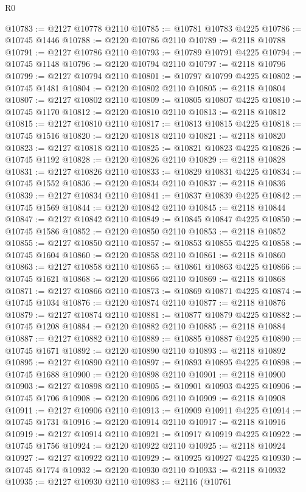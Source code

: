 \begin{lexlean}{R0}
\begin{coremodule}
@10783 := @2127 @10778 @2110
@10785 := @10781 @10783 @4225
@10786 := @10745 @1446
@10788 := @2120 @10786 @2110
@10789 := @2118 @10788
@10791 := @2127 @10786 @2110
@10793 := @10789 @10791 @4225
@10794 := @10745 @1148
@10796 := @2120 @10794 @2110
@10797 := @2118 @10796
@10799 := @2127 @10794 @2110
@10801 := @10797 @10799 @4225
@10802 := @10745 @1481
@10804 := @2120 @10802 @2110
@10805 := @2118 @10804
@10807 := @2127 @10802 @2110
@10809 := @10805 @10807 @4225
@10810 := @10745 @1170
@10812 := @2120 @10810 @2110
@10813 := @2118 @10812
@10815 := @2127 @10810 @2110
@10817 := @10813 @10815 @4225
@10818 := @10745 @1516
@10820 := @2120 @10818 @2110
@10821 := @2118 @10820
@10823 := @2127 @10818 @2110
@10825 := @10821 @10823 @4225
@10826 := @10745 @1192
@10828 := @2120 @10826 @2110
@10829 := @2118 @10828
@10831 := @2127 @10826 @2110
@10833 := @10829 @10831 @4225
@10834 := @10745 @1552
@10836 := @2120 @10834 @2110
@10837 := @2118 @10836
@10839 := @2127 @10834 @2110
@10841 := @10837 @10839 @4225
@10842 := @10745 @1569
@10844 := @2120 @10842 @2110
@10845 := @2118 @10844
@10847 := @2127 @10842 @2110
@10849 := @10845 @10847 @4225
@10850 := @10745 @1586
@10852 := @2120 @10850 @2110
@10853 := @2118 @10852
@10855 := @2127 @10850 @2110
@10857 := @10853 @10855 @4225
@10858 := @10745 @1604
@10860 := @2120 @10858 @2110
@10861 := @2118 @10860
@10863 := @2127 @10858 @2110
@10865 := @10861 @10863 @4225
@10866 := @10745 @1621
@10868 := @2120 @10866 @2110
@10869 := @2118 @10868
@10871 := @2127 @10866 @2110
@10873 := @10869 @10871 @4225
@10874 := @10745 @1034
@10876 := @2120 @10874 @2110
@10877 := @2118 @10876
@10879 := @2127 @10874 @2110
@10881 := @10877 @10879 @4225
@10882 := @10745 @1208
@10884 := @2120 @10882 @2110
@10885 := @2118 @10884
@10887 := @2127 @10882 @2110
@10889 := @10885 @10887 @4225
@10890 := @10745 @1671
@10892 := @2120 @10890 @2110
@10893 := @2118 @10892
@10895 := @2127 @10890 @2110
@10897 := @10893 @10895 @4225
@10898 := @10745 @1688
@10900 := @2120 @10898 @2110
@10901 := @2118 @10900
@10903 := @2127 @10898 @2110
@10905 := @10901 @10903 @4225
@10906 := @10745 @1706
@10908 := @2120 @10906 @2110
@10909 := @2118 @10908
@10911 := @2127 @10906 @2110
@10913 := @10909 @10911 @4225
@10914 := @10745 @1731
@10916 := @2120 @10914 @2110
@10917 := @2118 @10916
@10919 := @2127 @10914 @2110
@10921 := @10917 @10919 @4225
@10922 := @10745 @1756
@10924 := @2120 @10922 @2110
@10925 := @2118 @10924
@10927 := @2127 @10922 @2110
@10929 := @10925 @10927 @4225
@10930 := @10745 @1774
@10932 := @2120 @10930 @2110
@10933 := @2118 @10932
@10935 := @2127 @10930 @2110
@10983 := @2116
    (@10761

\end{coremodule}
\end{lexlean}
